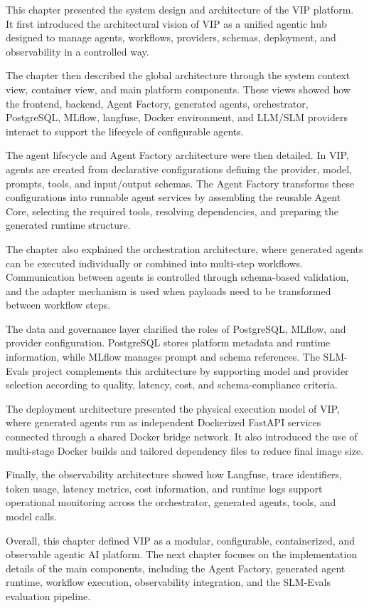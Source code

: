 This chapter presented the system design and architecture of the VIP platform. It first introduced the architectural vision of VIP as a unified agentic hub designed to manage agents, workflows, providers, schemas, deployment, and observability in a controlled way.

The chapter then described the global architecture through the system context view, container view, and main platform components. These views showed how the frontend, backend, Agent Factory, generated agents, orchestrator, PostgreSQL, MLflow, langfuse, Docker environment, and LLM/SLM providers interact to support the lifecycle of configurable agents.

The agent lifecycle and Agent Factory architecture were then detailed. In VIP, agents are created from declarative configurations defining the provider, model, prompts, tools, and input/output schemas. The Agent Factory transforms these configurations into runnable agent services by assembling the reusable Agent Core, selecting the required tools, resolving dependencies, and preparing the generated runtime structure.

The chapter also explained the orchestration architecture, where generated agents can be executed individually or combined into multi-step workflows. Communication between agents is controlled through schema-based validation, and the adapter mechanism is used when payloads need to be transformed between workflow steps.

The data and governance layer clarified the roles of PostgreSQL, MLflow, and provider configuration. PostgreSQL stores platform metadata and runtime information, while MLflow manages prompt and schema references. The SLM-Evals project complements this architecture by supporting model and provider selection according to quality, latency, cost, and schema-compliance criteria.

The deployment architecture presented the physical execution model of VIP, where generated agents run as independent Dockerized FastAPI services connected through a shared Docker bridge network. It also introduced the use of multi-stage Docker builds and tailored dependency files to reduce final image size.

Finally, the observability architecture showed how Langfuse, trace identifiers, token usage, latency metrics, cost information, and runtime logs support operational monitoring across the orchestrator, generated agents, tools, and model calls.

Overall, this chapter defined VIP as a modular, configurable, containerized, and observable agentic AI platform. The next chapter focuses on the implementation details of the main components, including the Agent Factory, generated agent runtime, workflow execution, observability integration, and the SLM-Evals evaluation pipeline.
